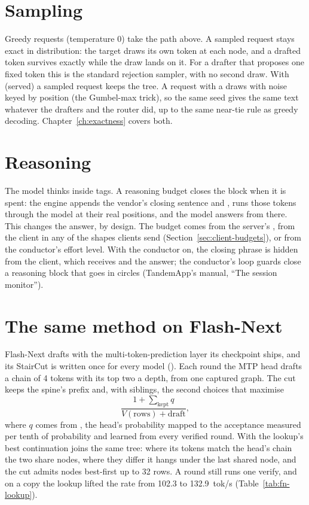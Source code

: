 \section{Sampling}

Greedy requests (temperature 0) take the path above. A sampled request stays exact in distribution: the target draws its own token at each node, and a drafted token survives exactly while the draw lands on it. For a drafter that proposes one fixed token this is the standard rejection sampler, with no second draw. With  (served) a sampled request keeps the tree. A request with a  draws with noise keyed by position (the Gumbel-max trick), so the same seed gives the same text whatever the drafters and the router did, up to the same near-tie rule as greedy decoding. Chapter~\ref{ch:exactness} covers both.

\section{Reasoning}

The model thinks inside  tags. A reasoning budget closes the block when it is spent: the engine appends the vendor's closing sentence and , runs those tokens through the model at their real positions, and the model answers from there. This changes the answer, by design. The budget comes from the server's , from the client in any of the shapes clients send (Section~\ref{sec:client-budgets}), or from the conductor's effort level. With the conductor on, the closing phrase is hidden from the client, which receives  and the answer; the conductor's loop guards close a reasoning block that goes in circles (TandemApp's manual, \enquote{The session monitor}).

\section{The same method on Flash-Next}\label{sec:spec-flashnext}

Flash-Next drafts with the multi-token-prediction layer its checkpoint ships, and its StairCut is written once for every model (). Each round the MTP head drafts a chain of 4 tokens with its top two a depth, from one captured graph. The cut keeps the spine's prefix and, with siblings, the second choices that maximise
\[
\frac{1 + \sum_{\text{kept}} q}{V(\text{rows}) + \text{draft}},
\]
where $q$ comes from , the head's probability mapped to the acceptance measured per tenth of probability and learned from every verified round. With  the lookup's best continuation joins the same tree: where its tokens match the head's chain the two share nodes, where they differ it hangs under the last shared node, and the cut admits nodes best-first up to 32 rows. A round still runs one verify, and on a copy the lookup lifted the rate from 102.3 to 132.9~tok/s (Table~\ref{tab:fn-lookup}).

